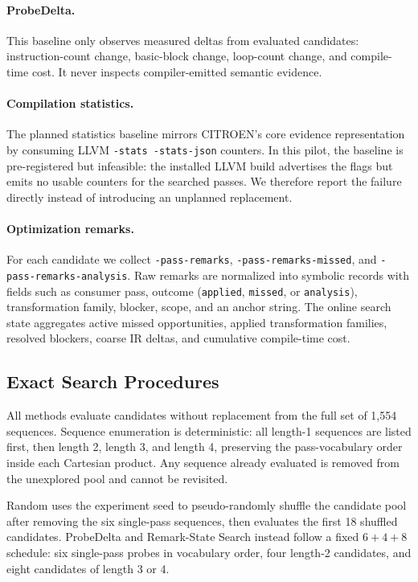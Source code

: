 \documentclass{article}
\newcommand{\method}{Remark-State Search}
\begin{document}
\paragraph{ProbeDelta.}
This baseline only observes measured deltas from evaluated candidates: instruction-count change, basic-block change, loop-count change, and compile-time cost. It never inspects compiler-emitted semantic evidence.

\paragraph{Compilation statistics.}
The planned statistics baseline mirrors CITROEN's core evidence representation by consuming LLVM \texttt{-stats -stats-json} counters. In this pilot, the baseline is pre-registered but infeasible: the installed LLVM build advertises the flags but emits no usable counters for the searched passes. We therefore report the failure directly instead of introducing an unplanned replacement.

\paragraph{Optimization remarks.}
For each candidate we collect \texttt{-pass-remarks}, \texttt{-pass-remarks-missed}, and \texttt{-pass-remarks-analysis}. Raw remarks are normalized into symbolic records with fields such as consumer pass, outcome (\texttt{applied}, \texttt{missed}, or \texttt{analysis}), transformation family, blocker, scope, and an anchor string. The online search state aggregates active missed opportunities, applied transformation families, resolved blockers, coarse IR deltas, and cumulative compile-time cost.

\subsection{Exact Search Procedures}

All methods evaluate candidates without replacement from the full set of 1{,}554 sequences. Sequence enumeration is deterministic: all length-1 sequences are listed first, then length 2, length 3, and length 4, preserving the pass-vocabulary order inside each Cartesian product. Any sequence already evaluated is removed from the unexplored pool and cannot be revisited.

Random uses the experiment seed to pseudo-randomly shuffle the candidate pool after removing the six single-pass sequences, then evaluates the first 18 shuffled candidates. ProbeDelta and \method{} instead follow a fixed $6+4+8$ schedule: six single-pass probes in vocabulary order, four length-2 candidates, and eight candidates of length 3 or 4.
\end{document}
